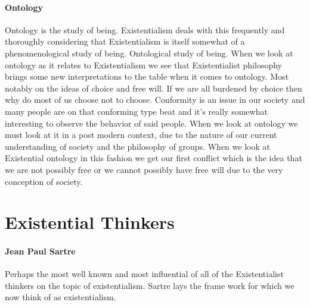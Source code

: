 \documentclass{book}
\begin{document}
\paragraph{Ontology}
Ontology is the study of being. Existentialism deals with this frequently and thoroughly considering that Existentialism is itself somewhat of a phenomenological study of being. Ontological study of being. When we look at ontology as it relates to Existentialism we see that Existentialist philosophy brings some new interpretations to the table when it comes to ontology. Most notably on the ideas of choice and free will. If we are all burdened by choice then why do most of us choose not to choose. Conformity is an issue in our society and many people are on that conforming type beat and it's really somewhat interesting to observe the behavior of said people. When we look at ontology we must look at it in a post modern context, due to the nature of our current understanding of society and the philosophy of groups. When we look at Existential ontology in this fashion we get our first conflict which is the idea that we are not possibly free or we cannot possibly have free will due to the very conception of society.

\section{Existential Thinkers}
\paragraph{Jean Paul Sartre}
Perhaps the most well known and most influential of all of the Existentialist thinkers on the topic of existentialism. Sartre lays the frame work for which we now think of as existentialism.
\end{document}

